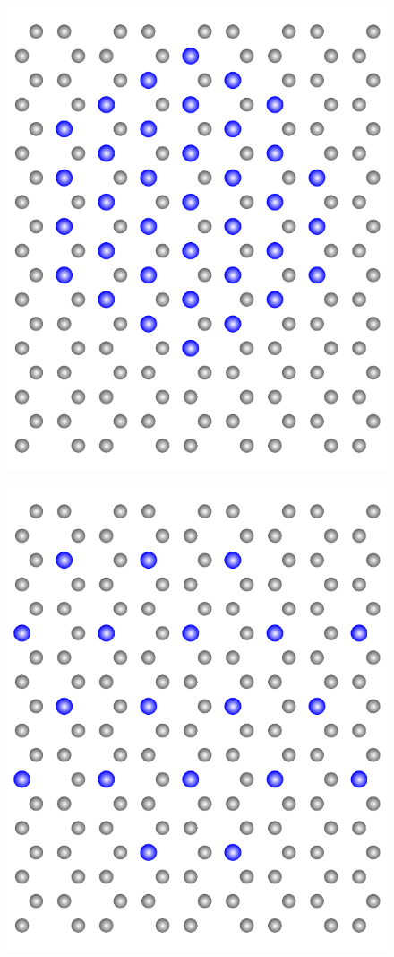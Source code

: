 \documentclass[a4paper, 10pt, twoside, openany]{book} %
\begin{document}
\begin{figure}
\begin{minipage}[b]{0.24\textwidth}
        \includegraphics[width=\textwidth]{Abbildungen/C2X.pdf}
        \label{C2X-Insel}
    \end{minipage}
    \hfill
    \begin{minipage}[b]{0.24\textwidth}
        \includegraphics[width=\textwidth]{Abbildungen/C6X.pdf}

\end{minipage}
\end{figure}
\end{document}
